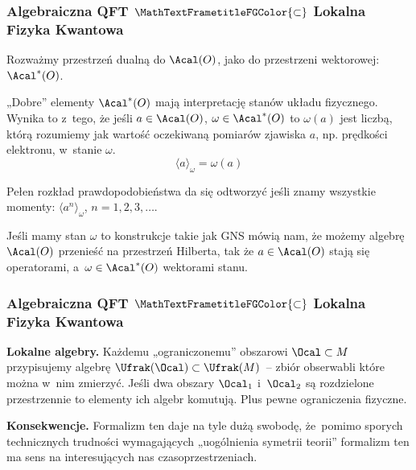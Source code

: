 \documentclass[10pt,t]{beamer}
\begin{document}
\begin{frame}
  \frametitle{Algebraiczna QFT $\MathTextFrametitleFGColor{\subset}$
    Lokalna Fizyka Kwantowa}


  Rozważmy przestrzeń dualną do $\Acal( O )$, jako do
  przestrzeni wektorowej: $\Acal^{ * }( O )$.

  „Dobre” elementy $\Acal^{ * }( O )$ mają interpretację
  stanów układu fizycznego. Wynika to z~tego, że jeśli
  $a \in \Acal( O )$, $\omega \in \Acal^{ * }( O )$ to
  $\omega( a )$ jest liczbą, którą rozumiemy jak wartość oczekiwaną
  pomiarów zjawiska $a$, np. prędkości elektronu, w~stanie $\omega$.
  \begin{equation}
    \label{eq:Niespodziewane-teoretyczne-13}
    \langle a \rangle_{ \omega } = \omega( a )
  \end{equation}

  Pełen rozkład prawdopodobieństwa da się odtworzyć jeśli znamy
  wszystkie momenty: $\langle a^{ n } \rangle_{ \omega }$,
  $n = 1, 2, 3, \ldots$.

  Jeśli mamy stan $\omega$ to konstrukcje takie jak GNS mówią nam, że
  możemy algebrę $\Acal( O )$ przenieść na przestrzeń Hilberta,
  tak że $a \in \Acal( O )$ stają się operatorami,
  a~$\omega \in \Acal^{ * }( O )$ wektorami stanu.

\end{frame}





\begin{frame}
  \frametitle{Algebraiczna QFT $\MathTextFrametitleFGColor{\subset}$
    Lokalna Fizyka Kwantowa}


  \textbf{Lokalne algebry.}
  Każdemu „ograniczonemu” obszarowi $\Ocal \subset M$ przypisujemy algebrę
  $\Ufrak( \Ocal ) \subset \Ufrak( M )$~-- zbiór obserwabli które można w~nim
  zmierzyć. Jeśli dwa obszary $\Ocal_{ 1 }$ i~$\Ocal_{ 2 }$ są rozdzielone
  przestrzennie to elementy ich algebr komutują. Plus pewne
  ograniczenia fizyczne.

  \textbf{Konsekwencje.}
  Formalizm ten daje na tyle dużą swobodę, że~pomimo sporych technicznych
  trudności wymagających „uogólnienia symetrii teorii” formalizm ten ma
  sens na interesujących nas czasoprzestrzeniach.

\end{frame}
\end{document}
